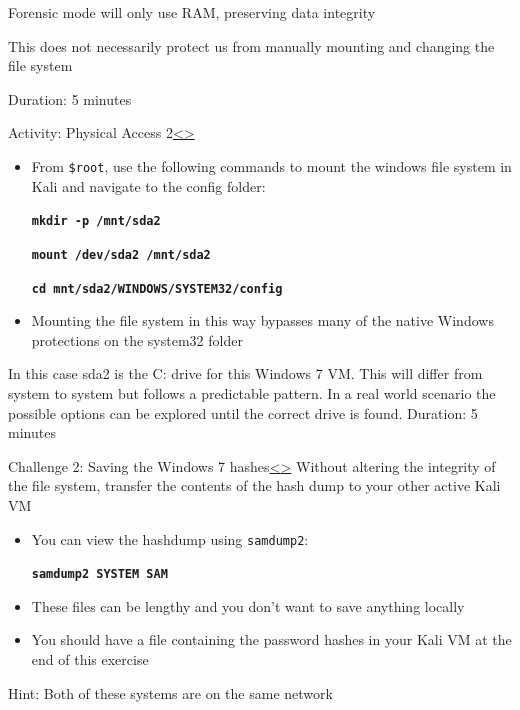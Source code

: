\documentclass[12pt]{article}
\newcommand{\code}[1]{\texttt{\bfseries#1}}
\newenvironment{instructionblock}{\Large\bgroup}{\egroup}
\newcommand{\bi}{\begin{itemize}}
\newcommand{\ei}{\end{itemize}}
\begin{document}
Forensic mode will only use RAM, preserving data integrity

This does not necessarily protect us from manually mounting and changing the file system

\vfill
Duration: 5 minutes


\pagebreak
\begin{slide}{Activity: Physical Access 2}{\hyperref[slide 14]{\textless}\hyperref[slide 16]{\textgreater}}
	\begin{instructionblock}
		\bi
			\item From \texttt{\$root}, use the following commands to mount the windows file system in Kali and navigate to the config folder:
		
			\code{mkdir -p /mnt/sda2}
			
			\code{mount /dev/sda2 /mnt/sda2}
			
			\code{cd mnt/sda2/WINDOWS/SYSTEM32/config}
			
			\item Mounting the file system in this way bypasses many of the native Windows protections on the system32 folder
		\ei
		
	\end{instructionblock}
\end{slide}
In this case sda2 is the C: drive for this Windows 7 VM. This will differ from system to system but follows a predictable pattern. In a real world scenario the possible options can be explored until the correct drive is found.
\vfill
Duration: 5 minutes

\pagebreak
\begin{slide}{Challenge 2: Saving the Windows 7 hashes}{\hyperref[slide 15]{\textless}\hyperref[slide 17]{\textgreater}}
	\begin{instructionblock}
		Without altering the integrity of the file system, transfer the contents of the hash dump to your other active Kali VM
		\bi
			\item You can view the hashdump using \texttt{samdump2}:
			
			\code{samdump2 SYSTEM SAM}
			
			\item These files can be lengthy and you don't want to save anything locally
			
			\item You should have a file containing the password hashes in your Kali VM at the end of this exercise
		\ei

	\end{instructionblock}
\end{slide}
Hint: Both of these systems are on the same network
\end{document}
